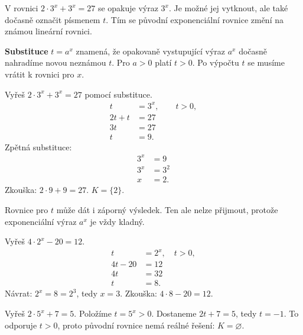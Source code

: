 \documentclass[11pt,a4paper]{article}
\begin{document}
V rovnici $2\cdot3^x+3^x=27$ se opakuje výraz $3^x$. Je možné jej vytknout, ale také dočasně označit písmenem $t$. Tím se původní exponenciální rovnice změní na známou lineární rovnici.
\begin{definiceBox}[title={Definice - Substituce exponenciálního výrazu}]
\textbf{Substituce} $t=a^x$ znamená, že opakovaně vystupující výraz $a^x$ dočasně nahradíme novou neznámou $t$. Pro $a>0$ platí $t>0$. Po výpočtu $t$ se musíme vrátit k rovnici pro $x$.
\end{definiceBox}
\begin{prikladReseniBox}[title={Příklad 1}]
Vyřeš $2\cdot3^x+3^x=27$ pomocí substituce.
\tcblower
\[\begin{aligned}t&=3^x,\qquad t>0,\\2t+t&=27\\3t&=27\\t&=9.\end{aligned}\]
Zpětná substituce:
\[\begin{aligned}3^x&=9\\3^x&=3^2\\x&=2.\end{aligned}\]
Zkouška: $2\cdot9+9=27$. $K=\{2\}$.
\end{prikladReseniBox}
Rovnice pro $t$ může dát i záporný výsledek. Ten ale nelze přijmout, protože exponenciální výraz $a^x$ je vždy kladný.
\begin{prikladReseniBox}[title={Příklad 2}]
Vyřeš $4\cdot2^x-20=12$.
\tcblower
\[\begin{aligned}t&=2^x,\quad t>0,\\4t-20&=12\\4t&=32\\t&=8.\end{aligned}\]
Návrat: $2^x=8=2^3$, tedy $x=3$. Zkouška: $4\cdot8-20=12$.
\end{prikladReseniBox}
\begin{prikladReseniBox}[title={Příklad 3}]
Vyřeš $2\cdot5^x+7=5$.
\tcblower
Položíme $t=5^x>0$. Dostaneme $2t+7=5$, tedy $t=-1$. To odporuje $t>0$, proto původní rovnice nemá reálné řešení: $K=\varnothing$.
\end{prikladReseniBox}
\end{document}
